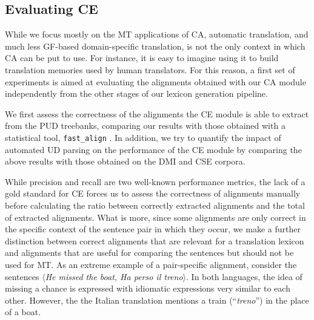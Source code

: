 \documentclass[11pt]{article}
\begin{document}
\subsection{Evaluating CE} \label{ceval}
While we focus mostly on the MT applications of CA, automatic translation, and much less GF-based domain-specific translation, is not the only context in which CA can be put to use. 
For instance, it is easy to imagine using it to build translation memories used by human translators.
For this reason, a first set of experiments is aimed at evaluating the alignments obtained with our CA module independently from the other stages of our lexicon generation pipeline.

We first assess the correctness of the alignments the CE module is able to extract from the PUD treebanks, comparing our results with those obtained with a statistical tool, \texttt{fast\_align} \cite{dyer-etal-2013-simple}. 
In addition, we try to quantify the impact of automated UD parsing on the performance of the CE module by comparing the above results with those obtained on the DMI and CSE corpora.

While precision and recall are two well-known performance metrics, the lack of a gold standard for CE forces us to assess the correctness of alignments manually before calculating the ratio between correctly extracted alignments and the total of extracted alignments.
What is more, since some alignments are only correct in the specific context of the sentence pair in which they occur, we make a further distinction between correct alignments that are relevant for a translation lexicon and alignments that are useful for comparing the sentences but should not be used for MT. 
As an extreme example of a pair-specific alignment, consider the sentences $\langle$\textit{He missed the boat, Ha perso il treno}$\rangle$. 
In both languages, the idea of missing a chance is expressed with idiomatic expressions very similar to each other. 
However, the the Italian translation mentions a train (``\textit{treno}'') in the place of a boat.
\end{document}
